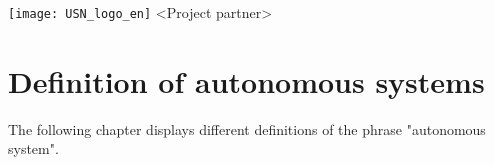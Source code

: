 \documentclass[%
oneside,    %
project,    %
nosummary   %
]{USN-MSc}
\newcommand{\myauthor}{%
223786 Lars Rikard Rådstoga
}
\newcommand{\myparticipants}{
<First participant>\\
<Second participant>\\
<Third participant>\\
<Fourth participant>
}
\begin{document}
\USNtitlepage%
{%
  {}
   \texttt{[image: USN\_logo\_en]}}
{<Project partner>}
{%
\lipsum[6-7]
}





\tableofcontents
{}





\chapter{Definition of autonomous systems}
\label{ch:definition}
The following chapter displays different definitions of the phrase "autonomous system".
\end{document}
